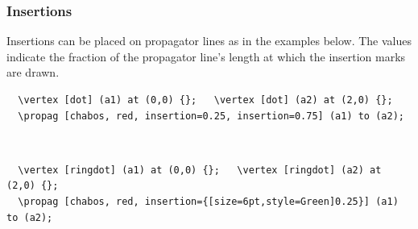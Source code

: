 \documentclass[10pt,letterpaper,twoside,notitlepage]{article}
\numberwithin{figure}{section}
\begin{document}
\subsubsection{Insertions}
\label{sec:_feynmandiagrams_propagators_insertions}
%
\noindent
Insertions can be placed on propagator lines as in the examples below.
The values indicate the fraction of the propagator line's length
at which the insertion marks are drawn.
\\
%
\begin{minipage}{0.83\linewidth}
\vercol\begin{verbatim}
  \vertex [dot] (a1) at (0,0) {};   \vertex [dot] (a2) at (2,0) {};
  \propag [chabos, red, insertion=0.25, insertion=0.75] (a1) to (a2);
\end{verbatim}\txcol
\end{minipage}
%
\begin{minipage}{0.16\linewidth}
\end{minipage}
\\
\begin{minipage}{0.83\linewidth}
\vercol\begin{verbatim}
  \vertex [ringdot] (a1) at (0,0) {};   \vertex [ringdot] (a2) at (2,0) {};
  \propag [chabos, red, insertion={[size=6pt,style=Green]0.25}] (a1) to (a2);
\end{verbatim}\txcol
\end{minipage}
%
\begin{minipage}{0.16\linewidth}
\end{minipage}
%
\vspace{-3mm}
\end{document}
